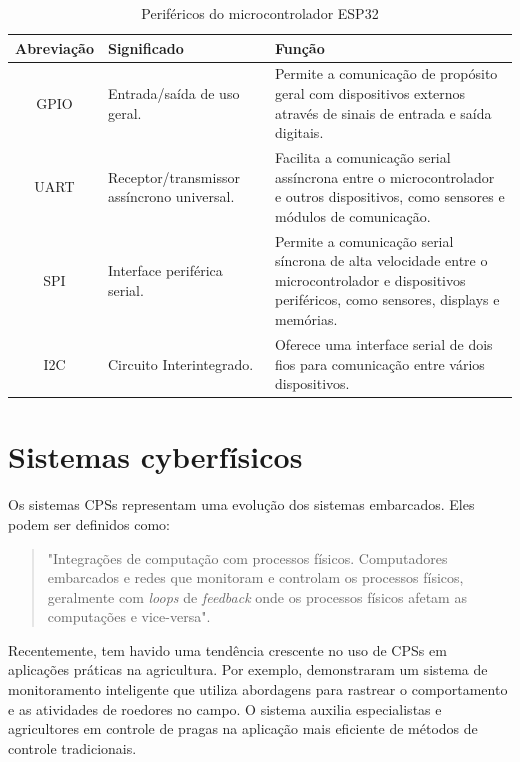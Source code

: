 \begin{table}[!htb]
  \caption{Periféricos do microcontrolador ESP32} \label{tab:esp32_perifericos}
  \begin{tabularx}{\textwidth}{|c|X|X|} \hline
    \textbf{Abreviação} & \textbf{Significado} & \textbf{Função} \\ \hline
    GPIO & Entrada/saída de uso geral. & Permite a comunicação de propósito geral com dispositivos externos através de sinais de entrada e saída digitais.  \\ \hline
    UART & Receptor/transmissor assíncrono universal. & Facilita a comunicação serial assíncrona entre o microcontrolador e outros dispositivos, como sensores e módulos de comunicação. \\ \hline
    SPI & Interface periférica serial. & Permite a comunicação serial síncrona de alta velocidade entre o microcontrolador e dispositivos periféricos, como sensores, displays e memórias. \\ \hline
    I2C & Circuito Interintegrado. & Oferece uma interface serial de dois fios para comunicação entre vários dispositivos. \\ \hline
  \end{tabularx}
\end{table}

\section{Sistemas cyberfísicos}

Os sistemas CPSs representam uma evolução dos sistemas embarcados. Eles podem ser definidos como:

\begin{quote}
"Integrações de computação com processos físicos. Computadores embarcados e redes que monitoram e controlam os processos físicos, geralmente com \textit{loops} de \textit{feedback} onde os processos físicos afetam as computações e vice-versa". \parencite[{p. 363}]{lee2008cyber}
\end{quote}

Recentemente, tem havido uma tendência crescente no uso de CPSs em aplicações práticas na agricultura. Por exemplo, \textcite{ahmad2020smart} demonstraram um sistema de monitoramento inteligente que utiliza abordagens para rastrear o comportamento e as atividades de roedores no campo. O sistema auxilia especialistas e agricultores em controle de pragas na aplicação mais eficiente de métodos de controle tradicionais.

